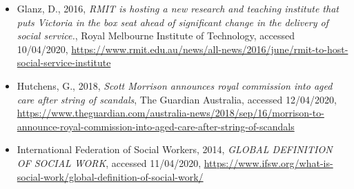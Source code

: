 \documentclass[
  11pt,
]{article}
\begin{document}
\begin{itemize}
\item
  Glanz, D., 2016, \emph{RMIT is hosting a new research and teaching institute that puts Victoria in the box seat ahead of significant change in the delivery of social service.}, Royal Melbourne Institute of Technology, accessed 10/04/2020, \url{https://www.rmit.edu.au/news/all-news/2016/june/rmit-to-host-social-service-institute}
\item
  Hutchens, G., 2018, \emph{Scott Morrison announces royal commission into aged care after string of scandals}, The Guardian Australia, accessed 12/04/2020, \url{https://www.theguardian.com/australia-news/2018/sep/16/morrison-to-announce-royal-commission-into-aged-care-after-string-of-scandals}
\item
  International Federation of Social Workers, 2014, \emph{GLOBAL DEFINITION OF SOCIAL WORK}, accessed 11/04/2020, \url{https://www.ifsw.org/what-is-social-work/global-definition-of-social-work/}
\end{itemize}

\newpage
\end{document}

